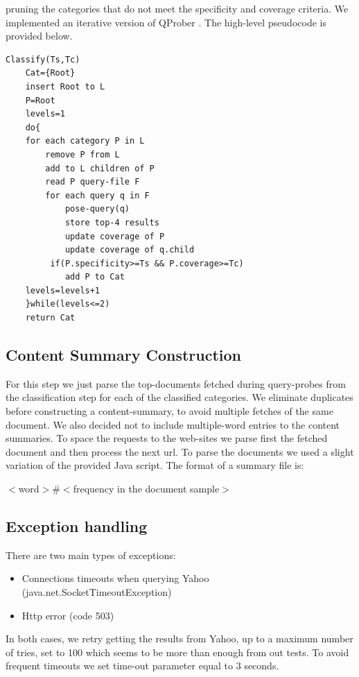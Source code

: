 \documentclass[11pt]{article}
\begin{document}
pruning the categories that do not meet the specificity and coverage criteria. We implemented an iterative version of QProber \cite{QProb}. The high-level pseudocode is provided below.

\begin{verbatim}
Classify(Ts,Tc)
    Cat={Root}
    insert Root to L
    P=Root
    levels=1
    do{
    for each category P in L
        remove P from L
        add to L children of P
        read P query-file F
        for each query q in F
            pose-query(q)
            store top-4 results
            update coverage of P
            update coverage of q.child
         if(P.specificity>=Ts && P.coverage>=Tc)
            add P to Cat
    levels=levels+1
    }while(levels<=2)
    return Cat
\end{verbatim}

\subsection{Content Summary Construction}

For this step we just parse the top-documents fetched during query-probes from the classification step for each of the classified categories. We eliminate duplicates before constructing 
a content-summary, to avoid multiple fetches of the same document. We also decided not to include multiple-word entries to the content summaries. To space the requests to the web-sites we parse first the fetched document and then process the next url. To parse the documents we used a slight variation of the provided Java script. The format of a summary file is:

$<$word$>\#<$frequency in the document sample$>$

\subsection{Exception handling}
There are two main types of exceptions:

\begin{itemize}
\item Connections timeouts when querying Yahoo (java.net.SocketTimeoutException)
\item Http error (code 503)
\end{itemize}

In both cases, we retry getting the results from Yahoo, up to a maximum number of tries, set to 100 which seems to be more than enough from out tests. To avoid frequent timeouts we set time-out parameter equal to 3 seconds.
\end{document}
